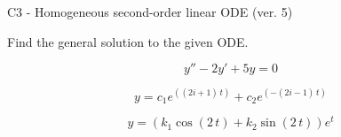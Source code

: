 \begin{exercise}
  \begin{exerciseTitle}C3 - Homogeneous second-order linear ODE (ver. 5)\end{exerciseTitle}
  \begin{exerciseStatement}
    
Find the general solution to the given ODE.

    
\[y''-2y'+5y = 0\]

  \end{exerciseStatement}
  \begin{exerciseAnswer}
    
\[y= c_{1} e^{\left(\left(2 i + 1\right) \, t\right)} + c_{2} e^{\left(-\left(2 i - 1\right) \, t\right)}\]

    
\[y= {\left(k_{1} \cos\left(2 \, t\right) + k_{2} \sin\left(2 \, t\right)\right)} e^{t}\]

  \end{exerciseAnswer}
\end{exercise}